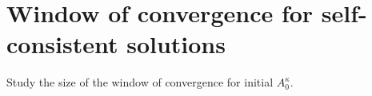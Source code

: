 \chapter{Window of convergence for self-consistent solutions}

Study the size of the window of convergence for initial $A_0^\kappa$.